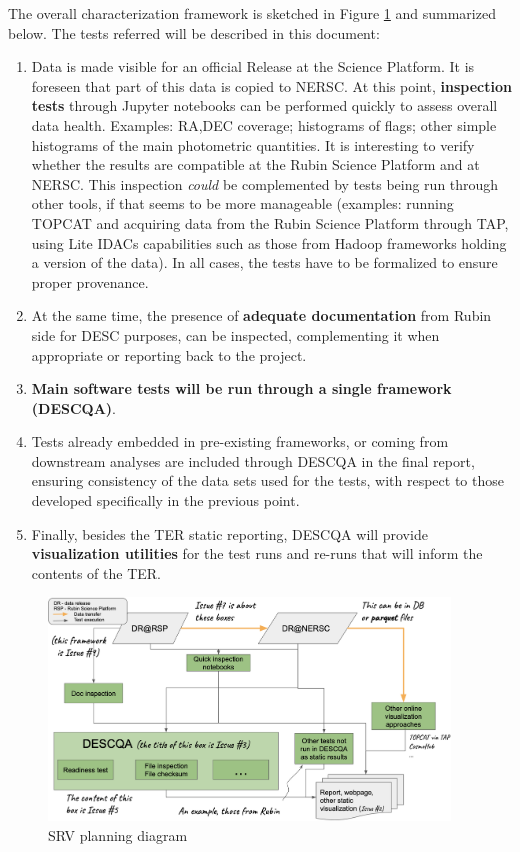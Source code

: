 \documentclass[12pt, a4paper]{article}
\begin{document}
The overall characterization framework is sketched in Figure \ref{fig:srvplanning} and summarized below. The tests referred will be described in this document:

\begin{enumerate}
	\item Data is made visible for an official Release at the Science Platform. It is foreseen that part of this data is copied to NERSC. At this point, \textbf{inspection tests} through Jupyter notebooks can be performed quickly to assess overall data health. Examples: RA,DEC coverage; histograms of flags; other simple histograms of the main photometric quantities. It is interesting to verify whether the results are compatible at the Rubin Science Platform and at NERSC. This inspection \textit{could} be complemented by tests being run through other tools, if that seems to be more manageable (examples: running TOPCAT and acquiring data from the Rubin Science Platform through TAP, using Lite IDACs capabilities such as those from Hadoop frameworks holding a version of the data). In all cases, the tests have to be formalized to ensure proper provenance.
	\item At the same time, the presence of \textbf{adequate documentation} from Rubin side for DESC purposes, can be inspected, complementing it when appropriate or reporting back to the project.
	\item \textbf{Main software tests will be run through a single framework (DESCQA)}.
	\item Tests already embedded in pre-existing frameworks, or coming from downstream analyses are included through DESCQA in the final report, ensuring consistency of the data sets used for the tests, with respect to those developed specifically in the previous point.
	\item Finally, besides the TER static reporting, DESCQA will provide \textbf{visualization utilities} for the test runs and re-runs that will inform the contents of the TER.
\end{enumerate}

\begin{figure}[h]
\begin{center}
\includegraphics[width=0.95\textwidth]{../SRV_planning_diagram.png} 
\caption{SRV planning diagram}
\label{fig:srvplanning}
\end{center}
\end{figure}
\end{document}
